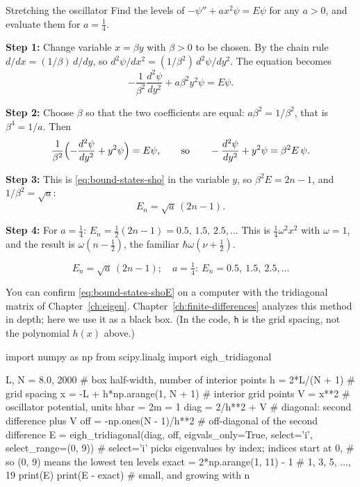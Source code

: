 \begin{sample}{Stretching the oscillator}
Find the levels of $-\psi''+ax^2\psi=E\psi$ for any $a>0$, and evaluate them for $a=\tfrac14$.

\textbf{Step 1:} Change variable $x=\beta y$ with $\beta>0$ to be chosen. By the chain rule $d/dx=(1/\beta)\,d/dy$, so $d^2\psi/dx^2=(1/\beta^2)\,d^2\psi/dy^2$. The equation becomes
\[
-\frac{1}{\beta^2}\frac{d^2\psi}{dy^2}+a\beta^2y^2\psi=E\psi .
\]

\textbf{Step 2:} Choose $\beta$ so that the two coefficients are equal: $a\beta^2=1/\beta^2$, that is $\beta^4=1/a$. Then
\[
\frac{1}{\beta^2}\Bigl(-\frac{d^2\psi}{dy^2}+y^2\psi\Bigr)=E\psi,\qquad\text{so}\qquad -\frac{d^2\psi}{dy^2}+y^2\psi=\beta^2E\,\psi .
\]

\textbf{Step 3:} This is \cref{eq:bound-states-sho} in the variable $y$, so $\beta^2E=2n-1$, and $1/\beta^2=\sqrt a$:
\[
E_n=\sqrt a\,(2n-1).
\]

\textbf{Step 4:} For $a=\tfrac14$: $E_n=\tfrac12(2n-1)=0.5,\,1.5,\,2.5,\dots$ This is $\tfrac14\omega^2x^2$ with $\omega=1$, and the result is $\omega(n-\tfrac12)$, the familiar $\hbar\omega(\nu+\tfrac12)$.

\[
\boxed{E_n=\sqrt a\,(2n-1);\quad a=\tfrac14:\ E_n=0.5,\ 1.5,\ 2.5,\dots}
\]
\end{sample}

You can confirm \cref{eq:bound-states-shoE} on a computer with the tridiagonal matrix of Chapter~\ref{ch:eigen}. Chapter~\ref{ch:finite-differences} analyzes this method in depth; here we use it as a black box. (In the code, \texttt{h} is the grid spacing, not the polynomial $h(x)$ above.)

\begin{pycode}
import numpy as np
from scipy.linalg import eigh_tridiagonal

L, N = 8.0, 2000                # box half-width, number of interior points
h = 2*L/(N + 1)                 # grid spacing
x = -L + h*np.arange(1, N + 1)  # interior grid points
V = x**2                        # oscillator potential, units hbar = 2m = 1
diag = 2/h**2 + V               # diagonal: second difference plus V
off = -np.ones(N - 1)/h**2      # off-diagonal of the second difference
E = eigh_tridiagonal(diag, off, eigvals_only=True,
                     select='i', select_range=(0, 9))
# select='i' picks eigenvalues by index; indices start at 0,
# so (0, 9) means the lowest ten levels
exact = 2*np.arange(1, 11) - 1  # 1, 3, 5, ..., 19
print(E)
print(E - exact)                # small, and growing with n
\end{pycode}

